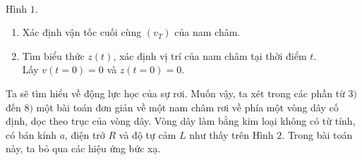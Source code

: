 \begin{vd}
\begin{center}
\begin{tikzpicture}[x=0.75pt,y=0.75pt,yscale=-1,xscale=1]
\end{tikzpicture}\\
Hình $1$.
\end{center}
\begin{enumerate}[1) ]
    \item Xác định vận tốc cuối cùng $(v_{T})$ của nam châm.
    \item Tìm biểu thức $z(t)$, xác định vị trí của nam châm tại thời điểm $t$.\\Lấy $v(t=0)=0$ và $z(t=0)=0$.
\end{enumerate}
Ta sẽ tìm hiểu về động lực học của sự rơi. Muốn vậy, ta xét trong các phần từ $3)$ đến $8)$ một bài toán đơn giản về một nam châm rơi về phía một vòng dây cố định, dọc theo trục của vòng dây. Vòng dây làm bằng kim loại không có từ tính, có bán kính $a$, điện trở $R$ và độ tự cảm $L$ như thấy trên Hình $2$. Trong bài toán này, ta bỏ qua các hiệu ứng bức xạ.\\
\begin{center}

\begin{tikzpicture}[x=0.75pt,y=0.75pt,yscale=-1,xscale=1]


\end{tikzpicture}
\end{center}
\end{vd}
